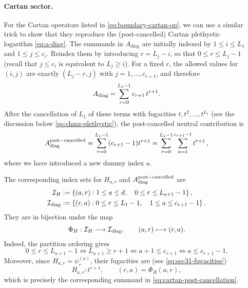 \documentclass[12pt,a4paper]{article}
\begin{document}
\paragraph{Cartan sector.} For the Cartan operators listed in \eqref{eq:boundary-cartan-op}, we can use a similar trick to show that they reproduce the (post-cancelled)  Cartan plethystic logarithm \eqref{eq:a-diag}. The summands in $A_{\text{diag}}$ are initially indexed by $1\leq i \leq L_1$ and $1\leq j\leq c_i$.  Reindex them by introducing
$r=L_j-i$, so that $0\leq r\leq L_j-1$ (recall that $j\leq c_i$ is equivalent to $L_j\geq i$).  For a fixed $r$, the allowed values for $(i,j)$
are exactly $(L_j-r,j)$ with
$j=1,\dots,c_{r+1}$, and therefore
\begin{equation}
 A_{\rm diag}
 =\sum_{r=0}^{L_1-1}c_{r+1}\,t^{r+1}.
 \label{eq:cartan-diag-reindex}
\end{equation}
After the cancellation of $L_1$ of these terms with fugacities $t,t^2,\dots,t^{L_1}$ (see the discussion below \eqref{eq:chmz-plethystic}), the
post-cancelled neutral contribution is
\begin{equation}
 A_{\rm diag}^{\rm post-cancelled}
 =\sum_{r=0}^{L_1-1}(c_{r+1}-1)t^{r+1}=\sum_{r=0}^{L_1-1}\sum_{a=1}^{c_{r+1}-1}t^{r+1}\,,
 \label{eq:cartan-post-cancellation}
\end{equation}
where we have introduced a new dummy index $a$. 

The corresponding index sets for $H_{a,r}$ and $A_{\rm diag}^{\rm post-cancelled}$ are
\begin{equation}
 \begin{aligned}
  \mathcal I_H
   &:=\left\{(a,r):1\leq a\leq d,\quad
                 0\leq r\leq L_{a+1}-1\right\},\\
  \mathcal I_{\rm diag}
   &:=\left\{(r,a):0\leq r\leq L_1-1,\quad
                 1\leq a\leq c_{r+1}-1\right\}.
 \end{aligned}
 \label{eq:cartan-index-sets}
\end{equation}
They are in bijection under the map
\begin{equation}
 \Phi_H:\mathcal I_H\longrightarrow\mathcal I_{\rm diag},
 \qquad (a,r)\longmapsto(r,a).
 \label{eq:cartan-index-map}
\end{equation}
Indeed, the partition ordering gives
\begin{equation}
 0\leq r\leq L_{a+1}-1
 \Longleftrightarrow
 L_{a+1}\geq r+1
\Longleftrightarrow
 a+1\leq c_{r+1}
\Longleftrightarrow
 a\leq c_{r+1}-1.
 \label{eq:cartan-range-equivalence}
\end{equation}
Moreover, since $H_{a,r}=\psi^{(a)}_r$, their fugacities are (see \eqref{eq:sec31-fugacities})
\begin{equation}
 H_{a,r}:t^{r+1},
 \qquad (r,a)=\Phi_H(a,r),
 \label{eq:cartan-fugacity-match}
\end{equation}
which is precisely the corresponding summand in \eqref{eq:cartan-post-cancellation}. 
\end{document}
